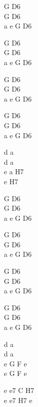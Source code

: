 \begin{chord}
    G D6\\
    G D6\\
    a e G D6

    G D6\\
    G D6\\
    a e G D6

    G D6\\
    G D6\\
    a e G D6

    G D6\\
    G D6\\
    a e G D6

    d a\\
    d a\\
    e a H7\\
    e H7

    G D6\\
    G D6\\
    a e G D6

    G D6\\
    G D6\\
    a e G D6

    G D6\\
    G D6\\
    a e G D6

    G D6\\
    G D6\\
    a e G D6

    d a\\
    d a\\
    e G F e\\
    e G F e

    e e7 C H7\\
    e e7 H7 e
\end{chord}
